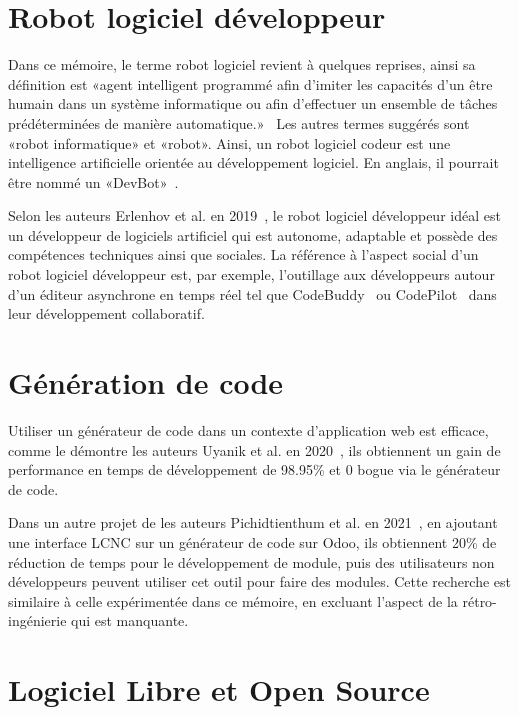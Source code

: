 \label{sec:RevLitt}

\section{Robot logiciel développeur}\label{robot_logiciel_developpeur_revue}

Dans ce mémoire, le terme robot logiciel revient à quelques reprises, ainsi sa définition est «agent intelligent programmé afin d'imiter les capacités d'un être humain dans un système informatique ou afin d'effectuer un ensemble de tâches prédéterminées de manière automatique.»~\cite{robot_logiciel_oqlf_2018} Les autres termes suggérés sont «robot informatique» et «robot». Ainsi, un robot logiciel codeur est une intelligence artificielle orientée au développement logiciel. En anglais, il pourrait être nommé un «DevBot»~\cite{8823643}.

Selon les auteurs Erlenhov et al. en 2019~\cite{8823643}, le robot logiciel développeur idéal est un développeur de logiciels artificiel qui est autonome, adaptable et possède des compétences techniques ainsi que sociales. La référence à l'aspect social d'un robot logiciel développeur est, par exemple, l'outillage aux développeurs autour d'un éditeur asynchrone en temps réel tel que CodeBuddy~\cite{10.1145/3287324.3293750} ou CodePilot~\cite{10.5555/1030453.1030540} dans leur développement collaboratif.

\section{Génération de code}

Utiliser un générateur de code dans un contexte d'application web est efficace, comme le démontre les auteurs Uyanik et al. en 2020~\cite{SAHIN2020}, ils obtiennent un gain de performance en temps de développement de 98.95\% et 0 bogue via le générateur de code.

Dans un autre projet de les auteurs Pichidtienthum et al. en 2021~\cite{9436754}, en ajoutant une interface LCNC sur un générateur de code sur Odoo, ils obtiennent 20\% de réduction de temps pour le développement de module, puis des utilisateurs non développeurs peuvent utiliser cet outil pour faire des modules. Cette recherche est similaire à celle expérimentée dans ce mémoire, en excluant l'aspect de la rétro-ingénierie qui est manquante.

\section{Logiciel Libre et Open Source}

